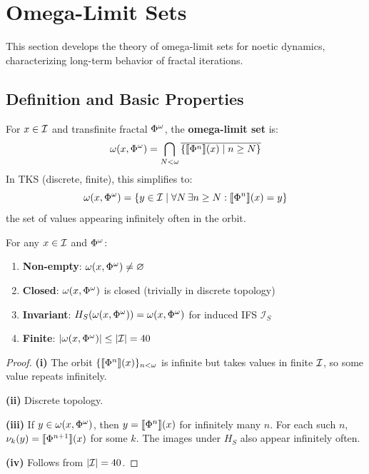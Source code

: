 \section{Omega-Limit Sets}
\label{sec:omega-limit-sets}

\begin{tcolorbox}[colback=blue!5!white,colframe=blue!75!black,title=\vnewthree]
This section develops the theory of omega-limit sets for noetic dynamics, characterizing long-term behavior of fractal iterations.
\end{tcolorbox}

\subsection{Definition and Basic Properties}

\begin{definition}
\label{def:omega-limit-set}
For $x \in \mathcal{I}$ and transfinite fractal $\Phi^{\omega}$, the \textbf{omega-limit set} is:
\[
\omega(x, \Phi^{\omega}) = \bigcap_{N < \omega} \overline{\{\llbracket \Phi^{n} \rrbracket(x) \mid n \geq N\}}
\]
In TKS (discrete, finite), this simplifies to:
\[
\omega(x, \Phi^{\omega}) = \{y \in \mathcal{I} \mid \forall N \, \exists n \geq N : \llbracket \Phi^{n} \rrbracket(x) = y\}
\]
the set of values appearing infinitely often in the orbit.
\end{definition}

\begin{proposition}
\label{prop:omega-limit-properties}
For any $x \in \mathcal{I}$ and $\Phi^{\omega}$:
\begin{enumerate}[label=(\roman*)]
  \item \textbf{Non-empty}: $\omega(x, \Phi^{\omega}) \neq \varnothing$
  \item \textbf{Closed}: $\omega(x, \Phi^{\omega})$ is closed (trivially in discrete topology)
  \item \textbf{Invariant}: $H_S(\omega(x, \Phi^{\omega})) = \omega(x, \Phi^{\omega})$ for induced IFS $\mathcal{I}_S$
  \item \textbf{Finite}: $|\omega(x, \Phi^{\omega})| \leq |\mathcal{I}| = 40$
\end{enumerate}
\end{proposition}

\begin{proof}
\textbf{(i)} The orbit $\{\llbracket \Phi^{n} \rrbracket(x)\}_{n < \omega}$ is infinite but takes values in finite $\mathcal{I}$, so some value repeats infinitely.

\textbf{(ii)} Discrete topology.

\textbf{(iii)} If $y \in \omega(x, \Phi^{\omega})$, then $y = \llbracket \Phi^{n} \rrbracket(x)$ for infinitely many $n$. For each such $n$, $\nu_{k}(y) = \llbracket \Phi^{n+1} \rrbracket(x)$ for some $k$. The images under $H_S$ also appear infinitely often.

\textbf{(iv)} Follows from $|\mathcal{I}| = 40$.
\end{proof}

